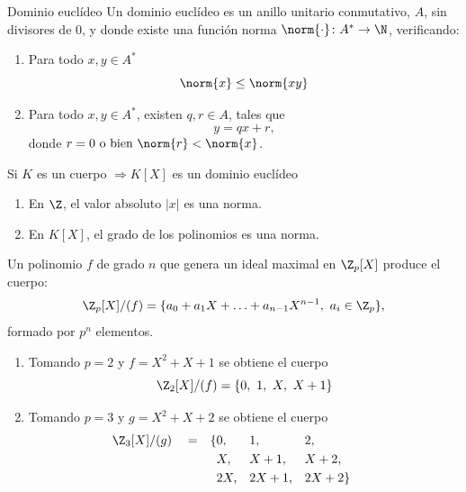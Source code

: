 \documentclass[10pt,t]{beamer}
\begin{document}
\begin{frame}
    \begin{block}{\centering \large Dominio euclídeo}
        Un dominio euclídeo es un anillo unitario conmutativo, $A$, sin divisores de 0, y donde existe una función norma $\norm{\cdot} \colon A^* \to \N$, verificando:
        \begin{enumerate}[label=\roman*)]
            \item Para todo $x,y\in A^*$ \[\norm{x} \leq\norm{xy}\]
            \item Para todo $x,y \in A^*$, existen $q,r \in A$, tales que 
                \[y = qx + r,\]
                donde $r = 0 \text{ o bien } \norm{r} < \norm{x}$.
        \end{enumerate}
    \end{block}

    \begin{prop}
        \centering Si $K$ es un cuerpo $\Longrightarrow K[X]$ es un dominio euclídeo 
    \end{prop}

    \begin{plainexample}
        \begin{enumerate}[label=--]
            \item En $\Z$, el valor absoluto $|x|$ es una norma.
            \item En $K[X]$, el grado de los polinomios es una norma.
        \end{enumerate}
    \end{plainexample}
\end{frame}

\begin{frame}
    \begin{prop}
        Un polinomio $f$ de grado $n$ que genera un ideal maximal en $\Z_p[X]$ produce el cuerpo:
        \[ \Z_p[X]/(f) = \{a_0 + a_1X +  \ldots + a_{n-1}X^{n-1} , \  a_i \in \Z_p\},\]
        formado por $p^n$ elementos.
    \end{prop}

    \begin{plainexample}
        \begin{enumerate}[label=--]
            \item Tomando $p = 2$ y $f = X^2+X+1$ se obtiene el cuerpo
            \[\Z_2[X]/(f) = \{0,\ 1,\ X,\ X+1\}\]
            \item Tomando $p = 3$ y $g = X^2 + X + 2$ se obtiene el cuerpo
            \begin{align*}
                \Z_3[X]/(g) \quad = &&\{  &0   ,&& 1   ,&& 2  ,   &&&&\\
                &&    &   X,&& X+1 ,&& X+2,   &&&&\\
                &&    &  2X,&& 2X+1,&& 2X+2\} &&&&
            \end{align*}
        \end{enumerate}
    \end{plainexample}
\end{frame}
\end{document}
